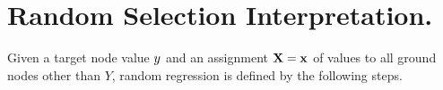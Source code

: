 \documentclass{article}
\begin{document}
%



\section{Random Selection Interpretation.}
%
Given a target node value $y$ and an assignment $\mathbf{X} = \mathbf{x}$ of values to all ground nodes other than $Y$, random regression is defined by the following steps.
\end{document}
